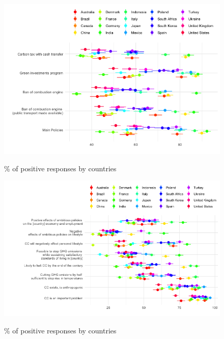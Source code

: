 \begin{frame}{}%
\begin{figure}[h!]
\caption{\% of positive responses by countries} %
\includegraphics[width=.7\paperwidth]{../figures/country_comparison/support_var_by_country.png} \\
\end{figure}
\end{frame}

\begin{frame}{}%
\begin{figure}[h!]
\caption{\% of positive responses by countries} %
\includegraphics[width=.7\paperwidth]{../figures/country_comparison/attitudes_by_country.png} \\
\end{figure}
\end{frame}

